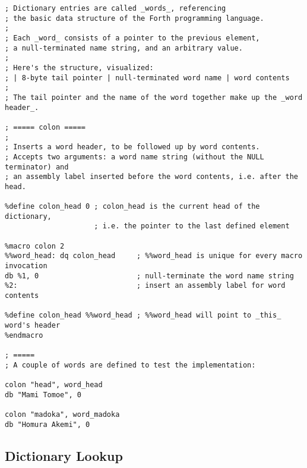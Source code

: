 \documentclass[12pt,a4paper]{report}
\begin{document}
\begin{lstlisting}[basicstyle=\scriptsize]
; Dictionary entries are called _words_, referencing
; the basic data structure of the Forth programming language.
;
; Each _word_ consists of a pointer to the previous element,
; a null-terminated name string, and an arbitrary value.
;
; Here's the structure, visualized:
; | 8-byte tail pointer | null-terminated word name | word contents
;
; The tail pointer and the name of the word together make up the _word header_.

; ===== colon =====
;
; Inserts a word header, to be followed up by word contents.
; Accepts two arguments: a word name string (without the NULL terminator) and
; an assembly label inserted before the word contents, i.e. after the head.

%define colon_head 0 ; colon_head is the current head of the dictionary,
                     ; i.e. the pointer to the last defined element

%macro colon 2
%%word_head: dq colon_head     ; %%word_head is unique for every macro invocation
db %1, 0                       ; null-terminate the word name string
%2:                            ; insert an assembly label for word contents

%define colon_head %%word_head ; %%word_head will point to _this_ word's header
%endmacro

; =====
; A couple of words are defined to test the implementation:

colon "head", word_head
db "Mami Tomoe", 0

colon "madoka", word_madoka
db "Homura Akemi", 0
\end{lstlisting}

\subsection*{Dictionary Lookup}
\end{document}
